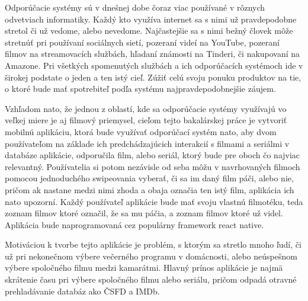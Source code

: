 
Odporúčacie systémy sú v dnešnej dobe čoraz viac používané v rôznych odvetviach informatiky. Každý kto využíva internet sa s nimi už pravdepodobne stretol či už vedome, alebo nevedome. Najčastejšie sa s nimi bežný človek môže stretnúť pri používaní sociálnych sietí, pozeraní videí na YouTube, pozeraní filmov na streamovacích službách, hľadaní známosti na Tinderi, či nakupovaní na Amazone. Pri všetkých spomenutých službách a ich odporúčacích systémoch ide v širokej podstate o jeden a ten istý cieľ. Zúžiť celú svoju ponuku produktov na tie, o ktoré bude mať spotrebiteľ podľa systému najpravdepodobnejšie záujem. \par
Vzhľadom nato, že jednou z oblastí, kde sa odporúčacie systémy využívajú vo veľkej miere je aj filmový priemysel, cieľom tejto bakalárskej práce je vytvoriť mobilnú aplikáciu, ktorá bude využívať odporúčací systém nato, aby dvom používateľom na základe ich predchádzajúcich interakcií s filmami a seriálmi v databáze aplikácie, odporučila film, alebo seriál, ktorý bude pre oboch čo najviac relevantný. Používatelia si potom nezávisle od seba môžu v navrhovaných filmoch pomocou jednoduchého swipeovania vyberať, či sa im daný film páči, alebo nie, pričom ak nastane medzi nimi zhoda a obaja označia ten istý film, aplikácia ich nato upozorní. Každý používateľ aplikácie bude mať svoju vlastnú filmotéku, teda zoznam filmov ktoré označil, že sa mu páčia, a zoznam filmov ktoré už videl. Aplikácia bude naprogramovaná cez populárny framework react native. \par
Motiváciou k tvorbe tejto aplikácie je problém, s ktorým sa stretlo mnoho ľudí, či už pri nekonečnom výbere večerného programu v domácnosti, alebo neúspešnom výbere spoločného filmu medzi kamarátmi. Hlavný prínos aplikácie je najmä skrátenie času pri výbere spoločného filmu alebo seriálu, pričom odpadá otravné prehladávanie databáz ako ČSFD a IMDb. \par
